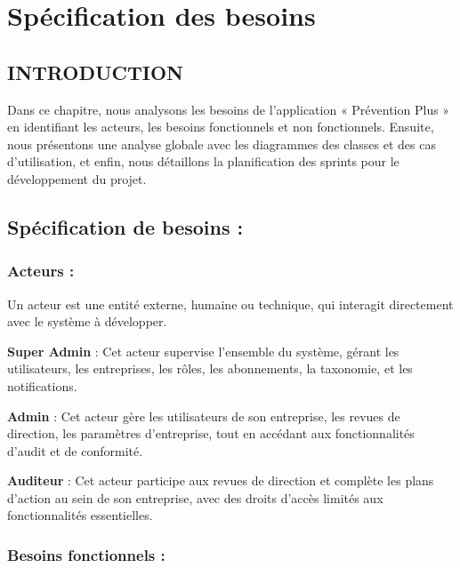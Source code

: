 \chapter{Spécification des besoins}

\begin{spacing}{1.2}
\minitoc
\thispagestyle{MyStyle}
\end{spacing}
\newpage

\section*{INTRODUCTION}

\noindent Dans ce chapitre, nous analysons les besoins de l'application « Prévention Plus » en identifiant les acteurs, les besoins fonctionnels et non fonctionnels. Ensuite, nous présentons une analyse globale avec les diagrammes des classes et des cas d'utilisation, et enfin, nous détaillons la planification des sprints pour le développement du projet.

\section{Spécification de besoins :}

\subsection{Acteurs :}

\noindent Un acteur est une entité externe, humaine ou technique, qui interagit directement avec le système à développer.

\noindent\textbf{Super Admin} : Cet acteur supervise l'ensemble du système, gérant les utilisateurs, les entreprises, les rôles, les abonnements, la taxonomie, et les notifications.

\noindent\textbf{Admin} : Cet acteur gère les utilisateurs de son entreprise, les revues de direction, les paramètres d'entreprise, tout en accédant aux fonctionnalités d'audit et de conformité.

\noindent\textbf{Auditeur} : Cet acteur participe aux revues de direction et complète les plans d'action au sein de son entreprise, avec des droits d'accès limités aux fonctionnalités essentielles.

\subsection{Besoins fonctionnels :}

